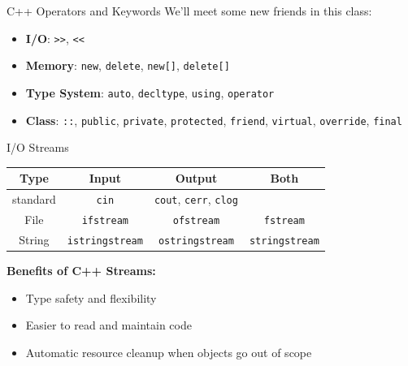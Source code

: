 \begin{frame}[fragile]{C++ Operators and Keywords}
	We'll meet some new friends in this class:
	\begin{itemize}
		\item \textbf{I/O}:  \texttt{>>}, \texttt{<<}
		\item \textbf{Memory}: \texttt{new}, \texttt{delete}, \texttt{new[]}, \texttt{delete[]}
		\item \textbf{Type System}: \texttt{auto}, \texttt{decltype}, \texttt{using}, \texttt{operator}
		\item \textbf{Class}: \texttt{::}, \texttt{public}, \texttt{private}, \texttt{protected}, \texttt{friend}, \texttt{virtual}, \texttt{override}, \texttt{final}
	\end{itemize}
\end{frame}

\begin{frame}[fragile]{I/O Streams}
	\begin{table}[]
		\begin{tabular}{cccc}
			\hline
			\textbf{Type} & \textbf{Input}         & \textbf{Output}                             & \textbf{Both}         \\ \hline
			standard      & \texttt{cin}           & \texttt{cout}, \texttt{cerr}, \texttt{clog} &                       \\ \hline
			File          & \texttt{ifstream}      & \texttt{ofstream}                           & \texttt{fstream}      \\ \hline
			String        & \texttt{istringstream} & \texttt{ostringstream}                      & \texttt{stringstream} \\ \hline
		\end{tabular}
	\end{table}

	\textbf{Benefits of C++ Streams:}
	\begin{itemize}
		\item Type safety and flexibility
		\item Easier to read and maintain code
		\item Automatic resource cleanup when objects go out of scope
	\end{itemize}
\end{frame}

